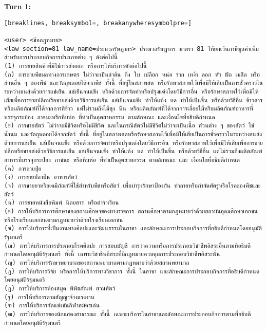 \textbf{Turn 1: }
\begin{Verbatim}[breaklines, breaksymbol=, breakanywheresymbolpre=]

<user> <ข้อกฎหมาย>
<law section=81 law_name=ประมวลรัษฎากร> ประมวลรัษฎากร มาตรา 81 ให้ยกเว้นภาษีมูลค่าเพิ่มสำหรับการประกอบกิจการประเภทต่าง ๆ ดังต่อไปนี้
(1) การขายสินค้าที่มิใช่การส่งออก หรือการให้บริการดังต่อไปนี้
(ก) การขายพืชผลทางการเกษตร ไม่ว่าจะเป็นลำต้น กิ่ง ใบ เปลือก หน่อ ราก เหง้า ดอก หัว ฝัก เมล็ด หรือส่วนอื่น ๆ ของพืช และวัตถุพลอยได้จากพืช ทั้งนี้ ที่อยู่ในสภาพสด หรือรักษาสภาพไว้เพื่อมิให้เสียเป็นการชั่วคราวในระหว่างขนส่งด้วยการแช่เย็น แช่เย็นจนแข็ง หรือด้วยการจัดทำหรือปรุงแต่งโดยวิธีการอื่น หรือรักษาสภาพไว้เพื่อมิให้เสียเพื่อการขายปลีกหรือขายส่งด้วยวิธีการแช่เย็น แช่เย็นจนแข็ง ทำให้แห้ง บด ทำให้เป็นชิ้น หรือด้วยวิธีอื่น ข้าวสารหรือผลิตภัณฑ์ที่ได้จากการสีข้าว แต่ไม่รวมถึงไม้ซุง ฟืน หรือผลิตภัณฑ์ที่ได้จากการเลื่อยไม้หรือผลิตภัณฑ์อาหารที่บรรจุกระป๋อง ภาชนะหรือหีบห่อ ที่ทำเป็นอุตสาหกรรม ตามลักษณะ และเงื่อนไขที่อธิบดีกำหนด
(ข) การขายสัตว์ ไม่ว่าจะมีชีวิตหรือไม่มีชีวิต และในกรณีสัตว์ไม่มีชีวิตไม่ว่าจะเป็นเนื้อ ส่วนต่าง ๆ ของสัตว์ ไข่ น้ำนม และวัตถุพลอยได้จากสัตว์ ทั้งนี้ ที่อยู่ในสภาพสดหรือรักษาสภาพไว้เพื่อมิให้เสียเป็นการชั่วคราวในระหว่างขนส่งด้วยการแช่เย็น แช่เย็นจนแข็ง หรือด้วยการจัดทำหรือปรุงแต่งโดยวิธีการอื่น หรือรักษาสภาพไว้เพื่อมิให้เสียเพื่อการขายปลีกหรือขายส่งด้วยวิธีการแช่เย็น แช่เย็นจนแข็ง ทำให้แห้ง บด ทำให้เป็นชิ้น หรือด้วยวิธีอื่น แต่ไม่รวมถึงผลิตภัณฑ์อาหารที่บรรจุกระป๋อง ภาชนะ หรือหีบห่อ ที่ทำเป็นอุตสาหกรรม ตามลักษณะ และ เงื่อนไขที่อธิบดีกำหนด
(ค) การขายปุ๋ย
(ง) การขายปลาป่น อาหารสัตว์
(จ) การขายยาหรือเคมีภัณฑ์ที่ใช้สำหรับพืชหรือสัตว์ เพื่อบำรุงรักษาป้องกัน ทำลายหรือกำจัดศัตรูหรือโรคของพืชและสัตว์
(ฉ) การขายหนังสือพิมพ์ นิตยสาร หรือตำราเรียน
(ช) การให้บริการการศึกษาของสถานศึกษาของทางราชการ สถานศึกษาตามกฎหมายว่าด้วยสถาบันอุดมศึกษาเอกชน หรือโรงเรียนเอกชนตามกฎหมายว่าด้วยโรงเรียนเอกชน
(ซ) การให้บริการที่เป็นงานทางศิลปะและวัฒนธรรมในสาขา และลักษณะการประกอบกิจการที่อธิบดีกำหนดโดยอนุมัติรัฐมนตรี
(ฌ) การให้บริการการประกอบโรคศิลปะ การสอบบัญชี การว่าความหรือการประกอบวิชาชีพอิสระอื่นตามที่อธิบดีกำหนดโดยอนุมัติรัฐมนตรี ทั้งนี้ เฉพาะวิชาชีพอิสระที่มีกฎหมายควบคุมการประกอบวิชาชีพอิสระนั้น
(ญ) การให้บริการรักษาพยาบาลของสถานพยาบาลตามกฎหมายว่าด้วยสถานพยาบาล
(ฎ) การให้บริการวิจัย หรือการให้บริการทางวิชาการ ทั้งนี้ ในสาขา และลักษณะการประกอบกิจการที่อธิบดีกำหนดโดยอนุมัติรัฐมนตรี
(ฎ) การให้บริการห้องสมุด พิพิธภัณฑ์ สวนสัตว์
(ฐ) การให้บริการตามสัญญาจ้างแรงงาน
(ฑ) การให้บริการจัดแข่งขันกีฬาสมัครเล่น
(ฒ) การให้บริการของนักแสดงสาธารณะ ทั้งนี้ เฉพาะบริการในสาขาและลักษณะการประกอบกิจการตามที่อธิบดีกำหนดโดยอนุมัติรัฐมนตรี

\end{Verbatim}
